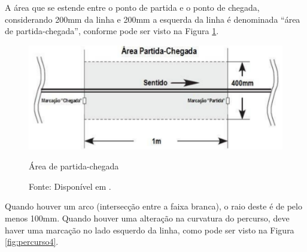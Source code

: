 A área que se estende entre o ponto de partida e o ponto de chegada, considerando 200mm da linha e 200mm a esquerda da linha
 é denominada ``área de partida-chegada'', conforme pode ser visto na Figura \ref{fig:percurso2}.\par

\vspace{0.6cm}
\begin{figure}[h!]
 \centering
 \captionsetup{width=0.55\textwidth,font=footnotesize,textfont=bf}
 \includegraphics[scale=0.5]{figuras/Percurso2.png}
 \caption{Área de partida-chegada \label{fig:percurso2}}
  \vspace{-0.3cm}
 \caption*{Fonte: Disponível em \cite[p.4]{RegrasRobocore}.}
\end{figure}



Quando houver um arco (intersecção entre a faixa branca), o raio deste é de pelo menos 100mm. Quando houver uma 
alteração na curvatura do percurso, deve haver uma marcação no lado esquerdo da linha, como pode ser visto na Figura 
\ref{fig:percurso4}.\par

